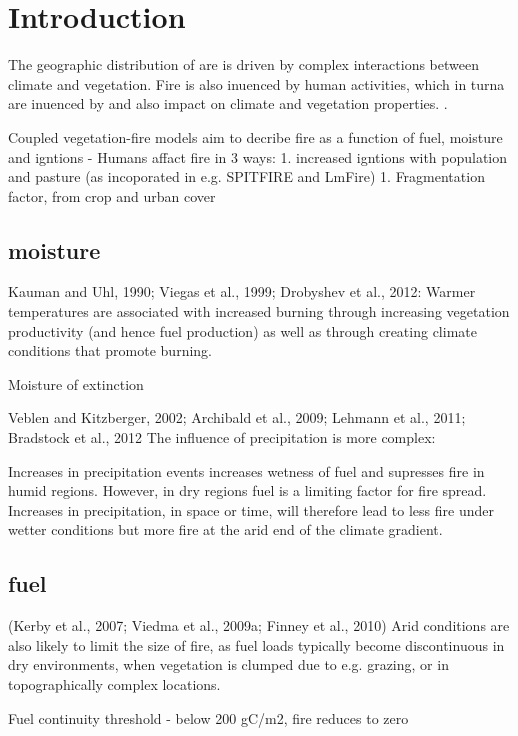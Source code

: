 \section{Introduction}

The geographic distribution of are is driven by complex interactions between climate and vegetation.  Fire is also inuenced by human activities, which in turna are  inuenced  by  and  also  impact  on  climate  and  vegetation  properties.  \citep{hantson2016status, kelley2014modelling}.
	
\citep{hantson2016status}
Coupled vegetation-fire models aim to decribe fire as a function of fuel, moisture and igntions 
- Humans affact fire in 3 ways:
	1. increased igntions with population and pasture (as incoporated in e.g. SPITFIRE and LmFire)
	1. Fragmentation factor, from crop and urban cover

\subsection{moisture}
Kauman and Uhl, 1990; Viegas et al., 1999; Drobyshev et al., 2012:
Warmer temperatures are associated with increased burning through increasing vegetation productivity (and hence fuel production) as well as through creating
climate conditions that promote burning.

Moisture of extinction

Veblen and Kitzberger, 2002; Archibald et al., 2009;  Lehmann  et  al.,  2011;  Bradstock  et  al.,  2012
The influence of precipitation is more complex:

Increases in precipitation events increases wetness of fuel and supresses fire in humid regions.
However, in dry regions fuel is a limiting factor for fire spread.  Increases in precipitation, in space or time, will therefore lead to less fire under wetter conditions but more fire at the arid end of the climate gradient.


\subsection{fuel}
(Kerby et al., 2007; Viedma et al., 2009a; Finney et al., 2010)
Arid  conditions  are  also  likely to limit the size of fire,  as fuel loads typically become discontinuous in dry environments, when vegetation is clumped due to e.g.  grazing, or in topographically complex locations.

\citep{thonicke2001role}
Fuel continuity threshold - below 200 gC/m2, fire reduces to zero 

